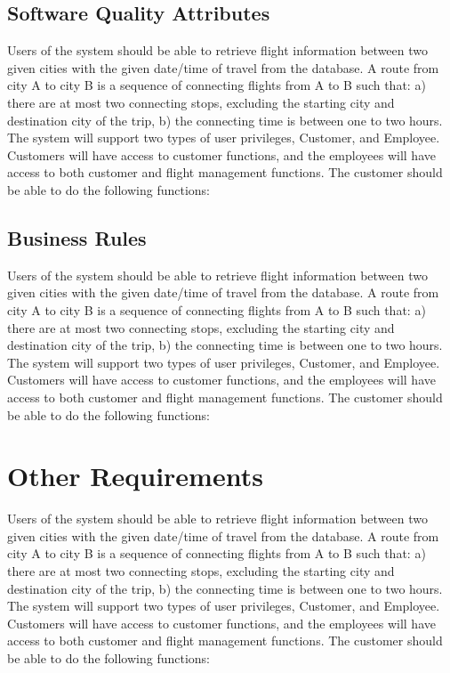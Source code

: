 \documentclass{scrreprt}
\begin{document}
    \section{Software Quality Attributes}
    Users of the system should be able to retrieve flight information between two given cities with the given date/time of travel from the database. A route from city A to city B is a sequence of connecting flights from A to B such that: a) there are at most two connecting stops, excluding the starting city and destination city of the trip, b) the connecting time is between one to two hours. The system will support two types of user privileges, Customer, and Employee. Customers will have access to customer functions, and the employees will have access to both customer and flight management functions. The customer should be able to do the following functions:  
    \section{Business Rules} 
    Users of the system should be able to retrieve flight information between two given cities with the given date/time of travel from the database. A route from city A to city B is a sequence of connecting flights from A to B such that: a) there are at most two connecting stops, excluding the starting city and destination city of the trip, b) the connecting time is between one to two hours. The system will support two types of user privileges, Customer, and Employee. Customers will have access to customer functions, and the employees will have access to both customer and flight management functions. The customer should be able to do the following functions:

    \chapter{Other Requirements}
    Users of the system should be able to retrieve flight information between two given cities with the given date/time of travel from the database. A route from city A to city B is a sequence of connecting flights from A to B such that: a) there are at most two connecting stops, excluding the starting city and destination city of the trip, b) the connecting time is between one to two hours. The system will support two types of user privileges, Customer, and Employee. Customers will have access to customer functions, and the employees will have access to both customer and flight management functions. The customer should be able to do the following functions:


    
\end{document}
